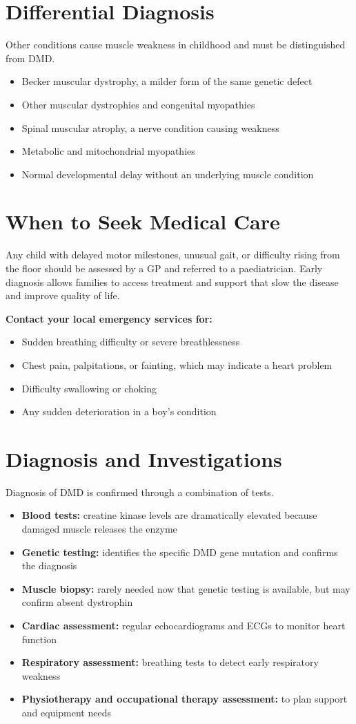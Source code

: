 \section*{Differential Diagnosis}
Other conditions cause muscle weakness in childhood and must be distinguished from DMD.
\begin{itemize}
    \item Becker muscular dystrophy, a milder form of the same genetic defect
    \item Other muscular dystrophies and congenital myopathies
    \item Spinal muscular atrophy, a nerve condition causing weakness
    \item Metabolic and mitochondrial myopathies
    \item Normal developmental delay without an underlying muscle condition
\end{itemize}

\section*{When to Seek Medical Care}
Any child with delayed motor milestones, unusual gait, or difficulty rising from the floor should be assessed by a GP and referred to a paediatrician. Early diagnosis allows families to access treatment and support that slow the disease and improve quality of life.

\textbf{Contact your local emergency services for:}
\begin{itemize}
    \item Sudden breathing difficulty or severe breathlessness
    \item Chest pain, palpitations, or fainting, which may indicate a heart problem
    \item Difficulty swallowing or choking
    \item Any sudden deterioration in a boy's condition
\end{itemize}

\section*{Diagnosis and Investigations}
Diagnosis of DMD is confirmed through a combination of tests.
\begin{itemize}
    \item \textbf{Blood tests:} creatine kinase levels are dramatically elevated because damaged muscle releases the enzyme
    \item \textbf{Genetic testing:} identifies the specific DMD gene mutation and confirms the diagnosis
    \item \textbf{Muscle biopsy:} rarely needed now that genetic testing is available, but may confirm absent dystrophin
    \item \textbf{Cardiac assessment:} regular echocardiograms and ECGs to monitor heart function
    \item \textbf{Respiratory assessment:} breathing tests to detect early respiratory weakness
    \item \textbf{Physiotherapy and occupational therapy assessment:} to plan support and equipment needs
\end{itemize}

